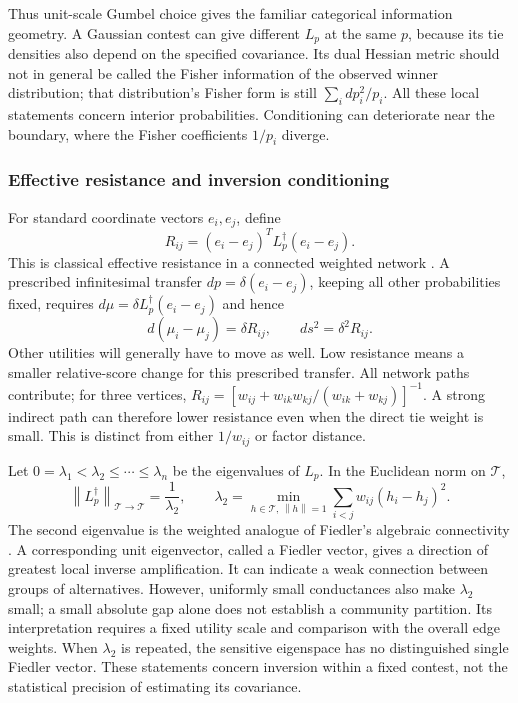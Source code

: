 \documentclass[11pt]{amsart}
\newcommand{\norm}[1]{\left\lVert#1\right\rVert}
\theoremstyle{definition}
\begin{document}
Thus unit-scale Gumbel choice gives the familiar categorical information
geometry. A Gaussian contest can give different $L_p$ at the same $p$, because
its tie densities also depend on the specified covariance. Its dual Hessian
metric should not in general be called the Fisher information of the observed
winner distribution; that distribution's Fisher form is still
$\sum_i dp_i^2/p_i$. All these local statements concern interior probabilities.
Conditioning can deteriorate near the boundary, where the Fisher coefficients
$1/p_i$ diverge.

\subsubsection{Effective resistance and inversion conditioning}
For standard coordinate vectors $e_i,e_j$, define
\begin{equation}\label{eq:resistance}
 R_{ij}=(e_i-e_j)^TL_p^\dagger(e_i-e_j).
\end{equation}
This is classical effective resistance in a connected weighted network
\cite{spielman2011}. A prescribed infinitesimal transfer
$dp=\delta(e_i-e_j)$, keeping all other probabilities fixed, requires
$d\mu=\delta L_p^\dagger(e_i-e_j)$ and hence
\begin{equation}\label{eq:resistance_response}
 d(\mu_i-\mu_j)=\delta R_{ij},\qquad ds^2=\delta^2R_{ij}.
\end{equation}
Other utilities will generally have to move as well. Low resistance means
a smaller relative-score change for this prescribed transfer. All network
paths contribute; for three vertices,
$R_{ij}=[w_{ij}+w_{ik}w_{kj}/(w_{ik}+w_{kj})]^{-1}$.
A strong indirect path can therefore lower resistance even when the direct
tie weight is small. This is distinct from either $1/w_{ij}$ or factor distance.

Let $0=\lambda_1<\lambda_2\leq\cdots\leq\lambda_n$ be the eigenvalues of
$L_p$. In the Euclidean norm on $\mathcal T$,
\begin{equation}\label{eq:spectral}
 \norm{L_p^\dagger}_{\mathcal T\to\mathcal T}=\frac1{\lambda_2},\qquad
 \lambda_2=\min_{h\in\mathcal T,\,\norm{h}=1}
       \sum_{i<j}w_{ij}(h_i-h_j)^2.
\end{equation}
The second eigenvalue is the weighted analogue of Fiedler's algebraic
connectivity \cite{fiedler1973}. A corresponding unit eigenvector, called a
Fiedler vector, gives a direction of greatest local inverse amplification.
It can indicate a weak connection between groups of alternatives. However,
uniformly small conductances also make $\lambda_2$ small; a small absolute
gap alone does not establish a community partition. Its interpretation
requires a fixed utility scale and comparison with the overall edge weights.
When $\lambda_2$ is repeated, the sensitive eigenspace has no distinguished
single Fiedler vector. These statements concern inversion within a fixed
contest, not the statistical precision of estimating its covariance.
\end{document}
